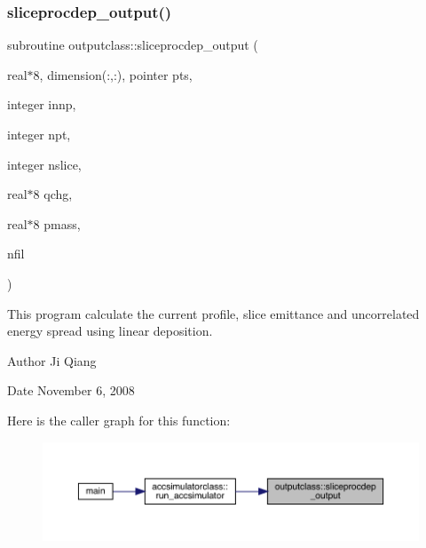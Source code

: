 \subsubsection{\texorpdfstring{sliceprocdep\_output()}{sliceprocdep\_output()}}
{\footnotesize\ttfamily subroutine outputclass\+::sliceprocdep\+\_\+output (\begin{DoxyParamCaption}\item[{real$\ast$8, dimension(\+:,\+:), pointer}]{pts,  }\item[{integer}]{innp,  }\item[{integer}]{npt,  }\item[{integer}]{nslice,  }\item[{real$\ast$8}]{qchg,  }\item[{real$\ast$8}]{pmass,  }\item[{}]{nfil }\end{DoxyParamCaption})}



This program calculate the current profile, slice emittance and uncorrelated energy spread using linear deposition. 

\begin{DoxyAuthor}{Author}
Ji Qiang 
\end{DoxyAuthor}
\begin{DoxyDate}{Date}
November 6, 2008 
\end{DoxyDate}
Here is the caller graph for this function\+:\nopagebreak
\begin{figure}[H]
\begin{center}
\leavevmode
\includegraphics[width=350pt]{namespaceoutputclass_aaba51e45761070d95883093a25e402c4_icgraph}
\end{center}
\end{figure}
